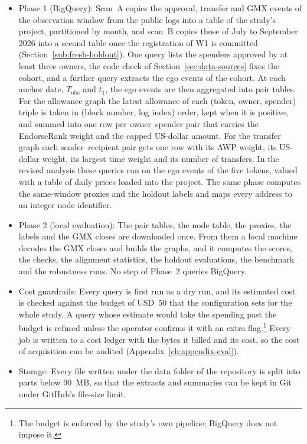 \begin{itemize}
\item Phase 1 (BigQuery): Scan~A copies the approval, transfer and GMX events of the observation window from the public logs into a table of the study's project, partitioned by month, and scan~B copies those of July to September 2026 into a second table once the registration of W1 is committed (Section~\ref{sub:fresh-holdout}). One query lists the spenders approved by at least three owners, the code check of Section~\ref{sec:data-sources} fixes the cohort, and a further query extracts the ego events of the cohort. At each anchor date, $T_{\mathrm{obs}}$ and $t_1$, the ego events are then aggregated into pair tables. For the allowance graph the latest allowance of each (token, owner, spender) triple is taken in (block number, log index) order, kept when it is positive, and summed into one row per owner--spender pair that carries the EndorseRank weight and the capped US-dollar amount. For the transfer graph each sender--recipient pair gets one row with its AWP weight, its US-dollar weight, its largest time weight and its number of transfers. In the revised analysis these queries run on the ego events of the five tokens, valued with a table of daily prices loaded into the project. The same phase computes the same-window proxies and the holdout labels and maps every address to an integer node identifier.

\item Phase 2 (local evaluation): The pair tables, the node table, the proxies, the labels and the GMX closes are downloaded once. From them a local machine decodes the GMX closes and builds the graphs, and it computes the scores, the checks, the alignment statistics, the holdout evaluations, the benchmark and the robustness runs. No step of Phase~2 queries BigQuery.

\item Cost guardrails: Every query is first run as a dry run, and its estimated cost is checked against the budget of USD~50 that the configuration sets for the whole study. A query whose estimate would take the spending past the budget is refused unless the operator confirms it with an extra flag.\footnote{The budget is enforced by the study's own pipeline; BigQuery does not impose it.} Every job is written to a cost ledger with the bytes it billed and its cost, so the cost of acquisition can be audited (Appendix~\ref{ch:appendix-eval}).

\item Storage: Every file written under the data folder of the repository is split into parts below 90~MB, so that the extracts and summaries can be kept in Git under GitHub's file-size limit.

\end{itemize}

